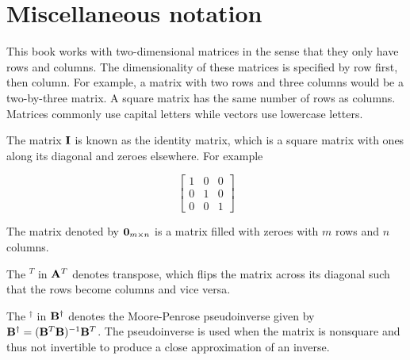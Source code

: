 \section{Miscellaneous notation}

This book works with two-dimensional matrices in the sense that they only have
rows and columns. The dimensionality of these matrices is specified by row
first, then column. For example, a matrix with two rows and three columns would
be a two-by-three matrix. A square matrix has the same number of rows as
columns. Matrices commonly use capital letters while vectors use lowercase
letters.

The matrix $\mathbf{I}$ is known as the identity matrix, which is a square matrix
with ones along its diagonal and zeroes elsewhere. For example

\begin{equation*}
  \begin{bmatrix}
    1 & 0 & 0 \\
    0 & 1 & 0 \\
    0 & 0 & 1
  \end{bmatrix}
\end{equation*}

The matrix denoted by $\mathbf{0}_{m \times n}$ is a matrix filled with zeroes with
$m$ rows and $n$ columns.

The $^T$ in $\mathbf{A}^T$ denotes transpose, which flips the matrix across its
diagonal such that the rows become columns and vice versa.

The $^\dagger$ in $\mathbf{B}^\dagger$ denotes the Moore-Penrose pseudoinverse
given by $\mathbf{B}^\dagger = (\mathbf{B}^T\mathbf{B})^{-1}\mathbf{B}^T$. The pseudoinverse
is used when the matrix is nonsquare and thus not invertible to produce a close
approximation of an inverse.
